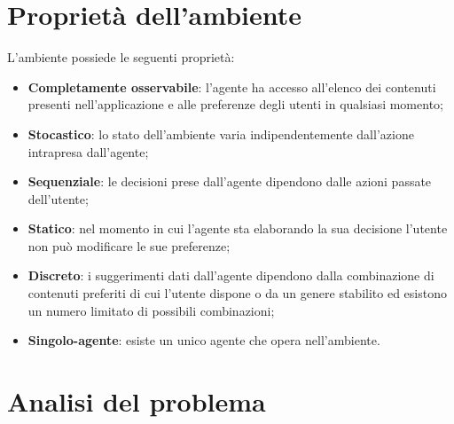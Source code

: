 \documentclass[a4paper, 12pt]{report}
\begin{document}
        \section{Proprietà dell'ambiente}\label{sec:proprieta-dell'ambiente}
            L’ambiente possiede le seguenti proprietà:
                \begin{itemize}
                    \item \textbf{Completamente osservabile}: l’agente ha accesso all’elenco dei contenuti presenti nell’applicazione
                    e alle preferenze degli utenti in qualsiasi momento;
                    \item \textbf{Stocastico}: lo stato dell’ambiente varia indipendentemente dall’azione intrapresa dall’agente;
                    \item \textbf{Sequenziale}: le decisioni prese dall’agente dipendono dalle azioni passate dell’utente;
                    \item \textbf{Statico}: nel momento in cui l’agente sta elaborando la sua decisione l’utente non può modificare
                    le sue preferenze;
                    \item \textbf{Discreto}: i suggerimenti dati dall’agente dipendono dalla combinazione di contenuti preferiti di cui
                    l’utente dispone o da un genere stabilito ed esistono un numero limitato di possibili combinazioni;
                    \item \textbf{Singolo-agente}: esiste un unico agente che opera nell’ambiente.
                \end{itemize}

        \section{Analisi del problema}\label{sec:analisi-del-problema}
\end{document}
